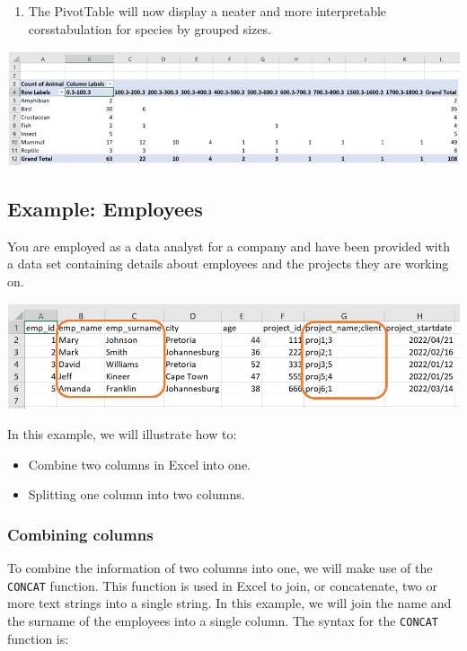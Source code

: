 \documentclass[
]{book}
\providecommand{\tightlist}{%
  \setlength{\itemsep}{0pt}\setlength{\parskip}{0pt}}
\begin{document}
\begin{enumerate}
\def\labelenumi{\arabic{enumi}.}
\setcounter{enumi}{4}
\tightlist
\item
  The PivotTable will now display a neater and more interpretable corsstabulation for species by grouped sizes.
\end{enumerate}

\begin{center}\includegraphics[width=0.8\linewidth]{Figures/pivot_8} \end{center}

\subsection{Example: Employees}\label{example-employees}

You are employed as a data analyst for a company and have been provided with a data set containing details about employees and the projects they are working on.

\begin{center}\includegraphics[width=0.8\linewidth]{Figures/combine_1} \end{center}

In this example, we will illustrate how to:

\begin{itemize}
\item
  Combine two columns in Excel into one.
\item
  Splitting one column into two columns.
\end{itemize}

\subsubsection*{Combining columns}\label{combining-columns}

To combine the information of two columns into one, we will make use of the \texttt{CONCAT} function. This function is used in Excel to join, or concatenate, two or more text strings into a single string. In this example, we will join the name and the surname of the employees into a single column. The syntax for the \texttt{CONCAT} function is:
\end{document}
